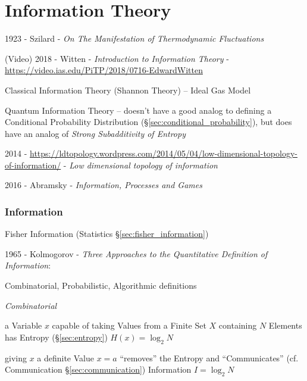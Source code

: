 \part{Information Theory}\label{part:information_theory}

1923 - Szilard - \emph{On The Manifestation of Thermodynamic Fluctuations}

\cite{shannon48}

(Video) 2018 - Witten - \emph{Introduction to Information Theory} -
\url{https://video.ias.edu/PiTP/2018/0716-EdwardWitten}

Classical Information Theory (Shannon Theory) -- Ideal Gas Model

Quantum Information Theory -- doesn't have a good analog to defining a
Conditional Probability Distribution (\S\ref{sec:conditional_probability}), but
does have an analog of \emph{Strong Subadditivity of Entropy}

2014 -
\url{https://ldtopology.wordpress.com/2014/05/04/low-dimensional-topology-of-information/} -
\emph{Low dimensional topology of information}

2016 - Abramsky - \emph{Information, Processes and Games}



\section{Information}\label{sec:information}

\fist Fisher Information (Statistics \S\ref{sec:fisher_information})

1965 - Kolmogorov -
\emph{Three Approaches to the Quantitative Definition of Information}:

Combinatorial, Probabilistic, Algorithmic definitions

\emph{Combinatorial}

a Variable $x$ capable of taking Values from a Finite Set $X$ containing $N$
Elements has Entropy (\S\ref{sec:entropy}) $H(x) = \log_2 N$

giving $x$ a definite Value $x = a$ ``removes'' the Entropy and ``Communicates''
(cf. Communication \S\ref{sec:communication}) Information $I = \log_2 N$


